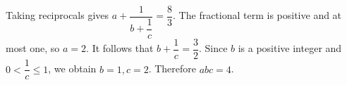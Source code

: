 Taking reciprocals gives $a+\dfrac{1}{b+\dfrac{1}{c}}=\dfrac{8}{3}$. The fractional term is positive and at most one, so $a=2$. It follows that $b+\dfrac{1}{c}=\dfrac{3}{2}$. Since $b$ is a positive integer and $0<\dfrac{1}{c}\le1$, we obtain $b=1,c=2$. Therefore $\boxed{abc=4}$.
